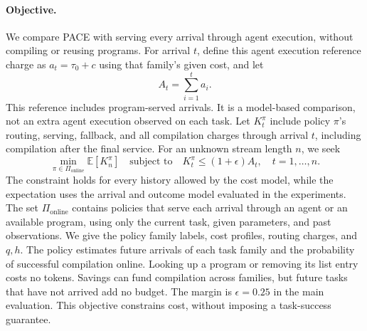 \paragraph{Objective.}
We compare PACE with serving every arrival through agent execution, without compiling or reusing programs.
For arrival $t$, define this agent execution reference charge as $a_t=\tau_0+c$ using that family's given cost, and let
\begin{equation}
A_t=\sum_{i=1}^{t}a_i.
\label{eq:agent-reference}
\end{equation}
This reference includes program-served arrivals.
It is a model-based comparison, not an extra agent execution observed on each task.
Let $K_t^\pi$ include policy $\pi$'s routing, serving, fallback, and all compilation charges through arrival $t$, including compilation after the final service.
For an unknown stream length $n$, we seek
\begin{equation}
\min_{\pi\in\Pi_{\mathrm{online}}}\mathbb{E}[K_n^\pi]
\quad\text{subject to}\quad
K_t^\pi\leq(1+\epsilon)A_t,\quad t=1,\ldots,n.
\label{eq:objective}
\end{equation}
The constraint holds for every history allowed by the cost model, while the expectation uses the arrival and outcome model evaluated in the experiments.
The set $\Pi_{\mathrm{online}}$ contains policies that serve each arrival through an agent or an available program, using only the current task, given parameters, and past observations.
We give the policy family labels, cost profiles, routing charges, and $q,h$.
The policy estimates future arrivals of each task family and the probability of successful compilation online.
Looking up a program or removing its list entry costs no tokens.
Savings can fund compilation across families, but future tasks that have not arrived add no budget.
The margin is $\epsilon=0.25$ in the main evaluation.
This objective constrains cost, without imposing a task-success guarantee.
